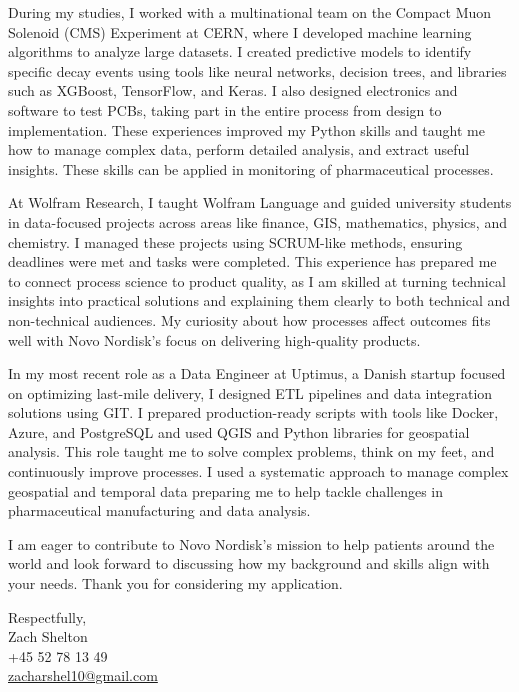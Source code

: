 \documentclass[11pt,a4]{article}
\begin{document}
During my studies, I worked with a multinational team on the Compact Muon Solenoid (CMS) Experiment at CERN, where I developed machine learning algorithms to analyze large datasets. I created predictive models to identify specific decay events using tools like neural networks, decision trees, and libraries such as XGBoost, TensorFlow, and Keras. I also designed electronics and software to test PCBs, taking part in the entire process from design to implementation. These experiences improved my Python skills and taught me how to manage complex data, perform detailed analysis, and extract useful insights. These skills can be applied in monitoring of pharmaceutical processes.

At Wolfram Research, I taught Wolfram Language and guided university students in data-focused projects across areas like finance, GIS, mathematics, physics, and chemistry. I managed these projects using SCRUM-like methods, ensuring deadlines were met and tasks were completed. This experience has prepared me to connect process science to product quality, as I am skilled at turning technical insights into practical solutions and explaining them clearly to both technical and non-technical audiences. My curiosity about how processes affect outcomes fits well with Novo Nordisk's focus on delivering high-quality products.

In my most recent role as a Data Engineer at Uptimus, a Danish startup focused on optimizing last-mile delivery, I designed ETL pipelines and data integration solutions using GIT. I prepared production-ready scripts with tools like Docker, Azure, and PostgreSQL and used QGIS and Python libraries for geospatial analysis. This role taught me to solve complex problems, think on my feet, and continuously improve processes. I used a systematic approach to manage complex geospatial and temporal data preparing me to help tackle challenges in pharmaceutical manufacturing and data analysis.

I am eager to contribute to Novo Nordisk's mission to help patients around the world and look forward to discussing how my background and skills align with your needs. Thank you for considering my application.

\vspace{0.5cm}
\raggedright
Respectfully, \\ Zach Shelton 
\\ 
+45 52 78 13 49 \\ 
\href{mailto:zacharshel10@gmail.com}{zacharshel10@gmail.com} 
\end{document}

